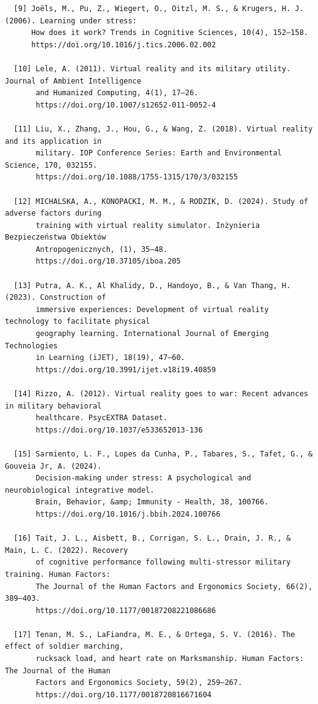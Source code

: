\documentclass[manuscript,screen,review]{acmart}
\begin{document}
\begin{verbatim}
  [9] Joëls, M., Pu, Z., Wiegert, O., Oitzl, M. S., & Krugers, H. J. (2006). Learning under stress: 
      How does it work? Trends in Cognitive Sciences, 10(4), 152–158. 
      https://doi.org/10.1016/j.tics.2006.02.002  
  
  [10] Lele, A. (2011). Virtual reality and its military utility. Journal of Ambient Intelligence 
       and Humanized Computing, 4(1), 17–26. 
       https://doi.org/10.1007/s12652-011-0052-4  
  
  [11] Liu, X., Zhang, J., Hou, G., & Wang, Z. (2018). Virtual reality and its application in 
       military. IOP Conference Series: Earth and Environmental Science, 170, 032155. 
       https://doi.org/10.1088/1755-1315/170/3/032155  
  
  [12] MICHALSKA, A., KONOPACKI, M. M., & RODZIK, D. (2024). Study of adverse factors during 
       training with virtual reality simulator. Inżynieria Bezpieczeństwa Obiektów 
       Antropogenicznych, (1), 35–48. 
       https://doi.org/10.37105/iboa.205  
  
  [13] Putra, A. K., Al Khalidy, D., Handoyo, B., & Van Thang, H. (2023). Construction of 
       immersive experiences: Development of virtual reality technology to facilitate physical 
       geography learning. International Journal of Emerging Technologies 
       in Learning (iJET), 18(19), 47–60. 
       https://doi.org/10.3991/ijet.v18i19.40859  
  
  [14] Rizzo, A. (2012). Virtual reality goes to war: Recent advances in military behavioral 
       healthcare. PsycEXTRA Dataset. 
       https://doi.org/10.1037/e533652013-136  
  
  [15] Sarmiento, L. F., Lopes da Cunha, P., Tabares, S., Tafet, G., & Gouveia Jr, A. (2024). 
       Decision-making under stress: A psychological and neurobiological integrative model. 
       Brain, Behavior, &amp; Immunity - Health, 38, 100766. 
       https://doi.org/10.1016/j.bbih.2024.100766  
  
  [16] Tait, J. L., Aisbett, B., Corrigan, S. L., Drain, J. R., & Main, L. C. (2022). Recovery 
       of cognitive performance following multi-stressor military training. Human Factors: 
       The Journal of the Human Factors and Ergonomics Society, 66(2), 389–403. 
       https://doi.org/10.1177/00187208221086686  
  
  [17] Tenan, M. S., LaFiandra, M. E., & Ortega, S. V. (2016). The effect of soldier marching, 
       rucksack load, and heart rate on Marksmanship. Human Factors: The Journal of the Human 
       Factors and Ergonomics Society, 59(2), 259–267. 
       https://doi.org/10.1177/0018720816671604  
  

\end{verbatim}
\end{document}
